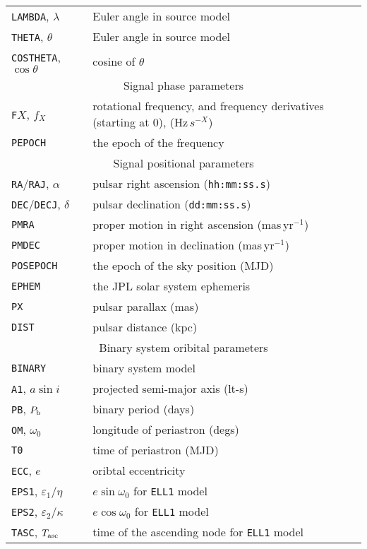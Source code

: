\begin{longtable}{l|l}
{\tt LAMBDA}, $\lambda$ & Euler angle in source model \citep[see][]{2015MNRAS.453.4399P} \\
{\tt THETA}, $\theta$ & Euler angle in source model \citep[see][]{2015MNRAS.453.4399P} \\
{\tt COSTHETA}, $\cos{\theta}$ & cosine of $\theta$ \\
\hline
\multicolumn{2}{c}{Signal phase parameters} \\
\hline
{\tt F}$X$, $f_X$ & rotational frequency, and frequency derivatives (starting at 0), (Hz$\,s^{-X}$) \\
{\tt PEPOCH} & the epoch of the frequency \\
\hline
\multicolumn{2}{c}{Signal positional parameters} \\
\hline
{\tt RA}/{\tt RAJ}, $\alpha$ & pulsar right ascension ({\tt hh:mm:ss.s}) \\
{\tt DEC}/{\tt DECJ}, $\delta$ & pulsar declination ({\tt dd:mm:ss.s}) \\
{\tt PMRA} & proper motion in right ascension (mas\,yr$^{-1}$) \\
{\tt PMDEC} & proper motion in declination (mas\,yr$^{-1}$) \\
{\tt POSEPOCH} & the epoch of the sky position (MJD) \\
{\tt EPHEM} & the JPL solar system ephemeris \\
{\tt PX} & pulsar parallax (mas) \\
{\tt DIST} & pulsar distance (kpc) \\
\hline
\multicolumn{2}{c}{Binary system oribital parameters} \\
\hline
{\tt BINARY} & binary system model \citep[see e.g.][and references therein]{1989ApJ...345..434T} \\
{\tt A1}, $a\sin{i}$ & projected semi-major axis (lt-s) \\
{\tt PB}, $P_{\rm b}$ & binary period (days) \\
{\tt OM}, $\omega_0$ & longitude of periastron (degs) \\
{\tt T0} & time of periastron (MJD) \\
{\tt ECC}, $e$ & oribtal eccentricity \\
{\tt EPS1}, $\varepsilon_1$/$\eta$ & $e\sin{\omega_0}$ for {\tt ELL1} model \citep[see Appendix in][]{2001MNRAS.326..274L} \\
{\tt EPS2}, $\varepsilon_2$/$\kappa$ & $e\cos{\omega_0}$ for {\tt ELL1} model \citep[see Appendix in][]{2001MNRAS.326..274L} \\
{\tt TASC}, $T_{\rm asc}$ & time of the ascending node for {\tt ELL1} model \citep[see Appendix in][]{2001MNRAS.326..274L} \\

\end{longtable}
